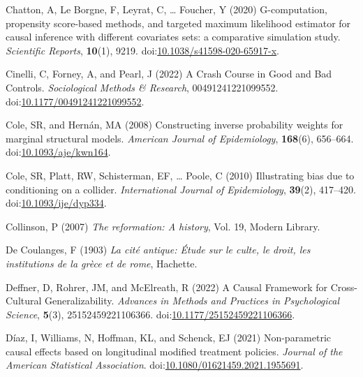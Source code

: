 \documentclass[
  singlecolumn]{article}
\newlength{\cslhangindent}
\newlength{\cslentryspacingunit} %
\newenvironment{CSLReferences}[2] %
 {%
  \setlength{\parindent}{0pt}
  \ifodd #1
  \let\oldpar\par
  \def\par{\hangindent=\cslhangindent\oldpar}
  \fi
  \setlength{\parskip}{#2\cslentryspacingunit}
 }%
 {}
\begin{document}
\begin{CSLReferences}{1}{0}
\leavevmode{}%
Chatton, A, Le Borgne, F, Leyrat, C, \ldots{} Foucher, Y (2020)
G-computation, propensity score-based methods, and targeted maximum
likelihood estimator for causal inference with different covariates
sets: a comparative simulation study. \emph{Scientific Reports},
\textbf{10}(1), 9219.
doi:\href{https://doi.org/10.1038/s41598-020-65917-x}{10.1038/s41598-020-65917-x}.

\leavevmode{}%
Cinelli, C, Forney, A, and Pearl, J (2022) A Crash Course in Good and
Bad Controls. \emph{Sociological Methods \& Research},
00491241221099552.
doi:\href{https://doi.org/10.1177/00491241221099552}{10.1177/00491241221099552}.

\leavevmode{}%
Cole, SR, and Hernán, MA (2008) Constructing inverse probability weights
for marginal structural models. \emph{American Journal of Epidemiology},
\textbf{168}(6), 656--664.
doi:\href{https://doi.org/10.1093/aje/kwn164}{10.1093/aje/kwn164}.

\leavevmode{}%
Cole, SR, Platt, RW, Schisterman, EF, \ldots{} Poole, C (2010)
Illustrating bias due to conditioning on a collider. \emph{International
Journal of Epidemiology}, \textbf{39}(2), 417--420.
doi:\href{https://doi.org/10.1093/ije/dyp334}{10.1093/ije/dyp334}.

\leavevmode{}%
Collinson, P (2007) \emph{The reformation: A history}, Vol. 19, Modern
Library.

\leavevmode{}%
De Coulanges, F (1903) \emph{La cité antique: Étude sur le culte, le
droit, les institutions de la grèce et de rome}, Hachette.

\leavevmode{}%
Deffner, D, Rohrer, JM, and McElreath, R (2022) A Causal Framework for
Cross-Cultural Generalizability. \emph{Advances in Methods and Practices
in Psychological Science}, \textbf{5}(3), 25152459221106366.
doi:\href{https://doi.org/10.1177/25152459221106366}{10.1177/25152459221106366}.

\leavevmode{}%
Díaz, I, Williams, N, Hoffman, KL, and Schenck, EJ (2021) Non-parametric
causal effects based on longitudinal modified treatment policies.
\emph{Journal of the American Statistical Association}.
doi:\href{https://doi.org/10.1080/01621459.2021.1955691}{10.1080/01621459.2021.1955691}.


\end{CSLReferences}
\end{document}
